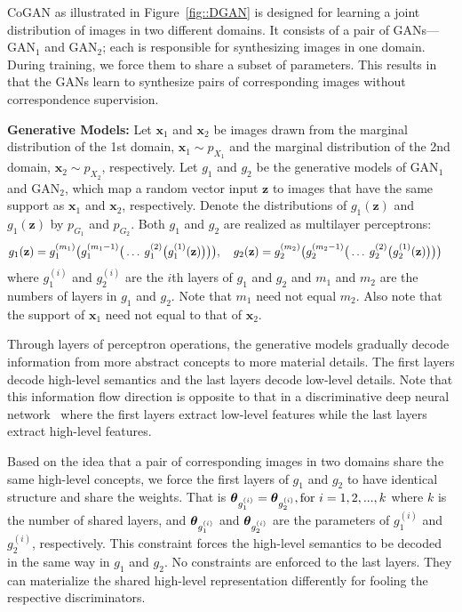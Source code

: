 \documentclass{article}
\begin{document}
CoGAN as illustrated in Figure~\ref{fig::DGAN} is designed for learning a joint distribution of images in two different domains. It consists of a pair of GANs---$\text{GAN}_1$ and $\text{GAN}_2$; each is responsible for synthesizing images in one domain. During training, we force them to share a subset of parameters. This results in that the GANs learn to synthesize pairs of corresponding images without correspondence supervision. 

{\bf Generative Models: }
Let $\mathbf{x}_1$ and $\mathbf{x}_2$ be images drawn from the marginal distribution of the 1st domain, $\mathbf{x}_1\sim p_{X_1}$ and the marginal distribution of the 2nd domain, $\mathbf{x}_2\sim p_{X_2}$, respectively. Let $g_1$ and $g_2$ be the generative models of $\text{GAN}_1$ and $\text{GAN}_2$, which map a random vector input $\mathbf{z}$ to images that have the same support as $\mathbf{x}_1$ and $\mathbf{x}_2$, respectively. Denote the distributions of $g_1(\mathbf{z})$ and $g_1(\mathbf{z})$ by $p_{G_1}$ and $p_{G_2}$. Both $g_1$ and $g_2$ are realized as multilayer perceptrons: 
\begin{align}
& g_1(\mathbf{z}) = g_1^{(m_1)}\big{(}g_1^{(m_1-1)}\big{(}\ldots\medspace g_1^{(2)}\big{(}g_1^{(1)}(\mathbf{z})\big{)}\big{)}\big{)},\quad
g_2(\mathbf{z}) = g_2^{(m_2)}\big{(}g_2^{(m_2-1)}\big{(}\ldots\medspace g_2^{(2)}\big{(}g_2^{(1)}(\mathbf{z})\big{)}\big{)}\big{)}\nonumber
\end{align}
where $g_1^{(i)}$ and $g_2^{(i)}$ are the $i$th layers of $g_1$ and $g_2$ and $m_1$ and $m_2$ are the numbers of layers in $g_1$ and $g_2$. Note that $m_1$ need not equal $m_2$. Also note that the support of $\mathbf{x}_1$ need not equal to that of $\mathbf{x}_2$.

Through layers of perceptron operations, the generative models gradually decode information from more abstract concepts to more material details. The first layers decode high-level semantics and the last layers decode low-level details. Note that this information flow direction is opposite to that in a discriminative deep neural network~\cite{krizhevsky2012imagenet} where the first layers extract low-level features while the last layers extract high-level features. 

Based on the idea that a pair of corresponding images in two domains share the same high-level concepts, we force the first layers of $g_1$ and $g_2$ to have identical structure and share the weights. That is 
$\text{\boldmath$\theta$}_{g_1^{(i)}}=\text{\boldmath$\theta$}_{g_2^{(i)}}, \text{for } i=1,2,...,k$
where $k$ is the number of shared layers, and $\text{\boldmath$\theta$}_{g_1^{(i)}}$ and $\text{\boldmath$\theta$}_{g_2^{(i)}}$ are the parameters of $g_1^{(i)}$ and $g_2^{(i)}$, respectively. This constraint forces the high-level semantics to be decoded in the same way in $g_1$ and $g_2$. No constraints are enforced to the last layers. They can materialize the shared high-level representation differently for fooling the respective discriminators.
\end{document}
